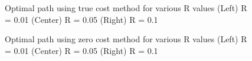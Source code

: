 \begin{figure}[t]
\centering
{}
\caption[Optimal path using true cost]{Optimal path using true cost method for various R values (Left) R = 0.01 (Center) R = 0.05 (Right) R = 0.1}
\label{fig:true}
\end{figure}

\begin{figure}[t]
\centering
{}
\caption[Optimal path using zero cost]{Optimal path using zero cost method for various R values (Left) R = 0.01 (Center) R = 0.05 (Right) R = 0.1}
\label{fig:zero}
\end{figure}
